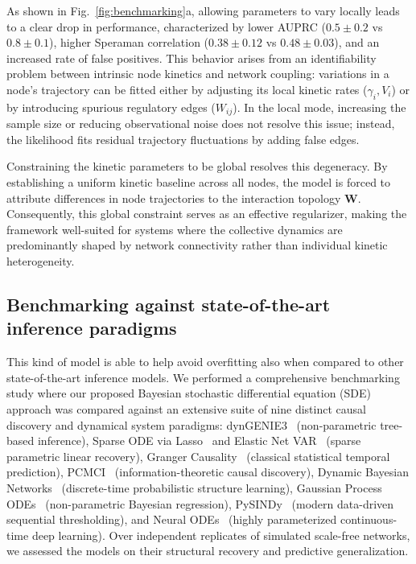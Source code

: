 \documentclass[10pt, aps, rmp,  twocolumn, superscriptaddress, floatfix, showkeys]{revtex4-2}
\begin{document}
As shown in Fig.~\ref{fig:benchmarking}a, allowing parameters to vary locally leads to a clear drop in performance, characterized by lower AUPRC ($0.5 \pm 0.2$ vs $0.8 \pm 0.1$), higher Speraman correlation ($0.38 \pm 0.12$ vs $0.48 \pm 0.03$), and an increased rate of false positives. This behavior arises from an identifiability problem between intrinsic node kinetics and network coupling: variations in a node's trajectory can be fitted either by adjusting its local kinetic rates ($\gamma_i, V_i$) or by introducing spurious regulatory edges ($W_{ij}$). In the local mode, increasing the sample size or reducing observational noise does not resolve this issue; instead, the likelihood fits residual trajectory fluctuations by adding false edges.

Constraining the kinetic parameters to be global resolves this degeneracy. By establishing a uniform kinetic baseline across all nodes, the model is forced to attribute differences in node trajectories to the interaction topology $\mathbf{W}$. Consequently, this global constraint serves as an effective regularizer, making the framework well-suited for systems where the collective dynamics are predominantly shaped by network connectivity rather than individual kinetic heterogeneity.

\subsection{Benchmarking against state-of-the-art inference paradigms}

This kind of model is able to help avoid overfitting also when compared to other state-of-the-art inference models. We performed a comprehensive benchmarking study where our proposed Bayesian stochastic differential equation (SDE) approach was compared against an extensive suite of nine distinct causal discovery and dynamical system paradigms: dynGENIE3~\cite{huynh2018dyngenie3} (non-parametric tree-based inference), Sparse ODE via Lasso~\cite{tibshirani1996regression, bonneau2006inferelator} and Elastic Net VAR~\cite{zou2005regularization} (sparse parametric linear recovery), Granger Causality~\cite{granger1969investigating, shojaie2010discovering} (classical statistical temporal prediction), PCMCI~\cite{runge2019inferring} (information-theoretic causal discovery), Dynamic Bayesian Networks~\cite{husmeier2003sensitivity} (discrete-time probabilistic structure learning), Gaussian Process ODEs~\cite{calderhead2008accelerating} (non-parametric Bayesian regression), PySINDy~\cite{kaptanoglu2021pysindy} (modern data-driven sequential thresholding), and Neural ODEs~\cite{chen2018neural} (highly parameterized continuous-time deep learning). Over independent replicates of simulated scale-free networks, we assessed the models on their structural recovery and predictive generalization. 
\end{document}
